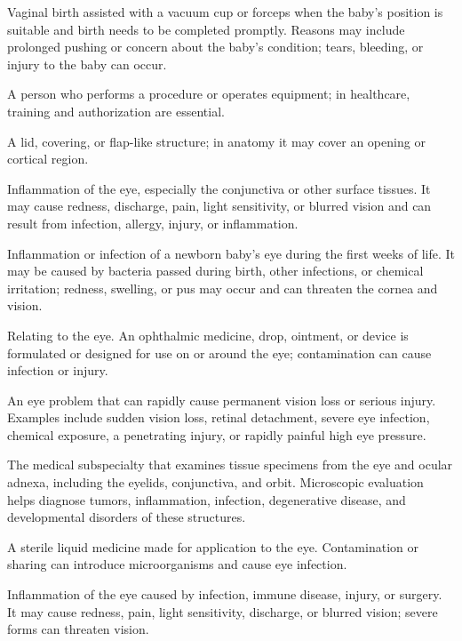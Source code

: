  Vaginal birth assisted with a vacuum cup or forceps when the baby's position is suitable and birth needs to be completed promptly. Reasons may include prolonged pushing or concern about the baby's condition; tears, bleeding, or injury to the baby can occur.

 A person who performs a procedure or operates equipment; in healthcare, training and authorization are essential.

 A lid, covering, or flap-like structure; in anatomy it may cover an opening or cortical region.

 Inflammation of the eye, especially the conjunctiva or other surface tissues. It may cause redness, discharge, pain, light sensitivity, or blurred vision and can result from infection, allergy, injury, or inflammation.

 Inflammation or infection of a newborn baby's eye during the first weeks of life. It may be caused by bacteria passed during birth, other infections, or chemical irritation; redness, swelling, or pus may occur and can threaten the cornea and vision.

 Relating to the eye. An ophthalmic medicine, drop, ointment, or device is formulated or designed for use on or around the eye; contamination can cause infection or injury.

 An eye problem that can rapidly cause permanent vision loss or serious injury. Examples include sudden vision loss, retinal detachment, severe eye infection, chemical exposure, a penetrating injury, or rapidly painful high eye pressure.

 The medical subspecialty that examines tissue specimens from the eye and
ocular adnexa, including the eyelids, conjunctiva, and orbit. Microscopic evaluation helps
diagnose tumors, inflammation, infection, degenerative disease, and developmental disorders
of these structures.

 A sterile liquid medicine made for application to the eye. Contamination or sharing can introduce microorganisms and cause eye infection.

 Inflammation of the eye caused by infection, immune disease, injury, or surgery. It may cause redness, pain, light sensitivity, discharge, or blurred vision; severe forms can threaten vision.

